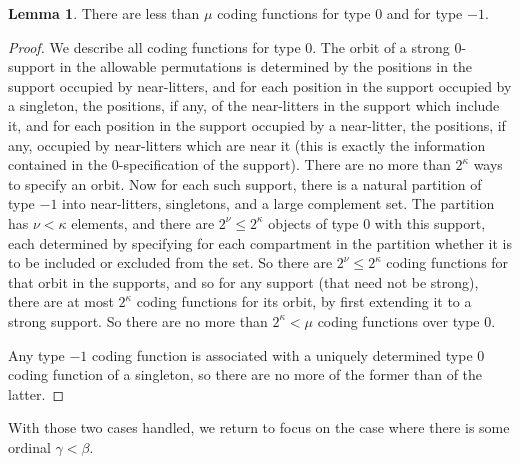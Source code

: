 \documentclass{article}
\theoremstyle{definition}
\newtheorem{lemma}[theorem]{Lemma}
\theoremstyle{remark}
\begin{document}
\begin{lemma}\label{lem:count_coding_function_zero}
There are less than $\mu$ coding functions for type 0 and for type $-1$.
\end{lemma}
\begin{proof}
We describe all coding functions for type 0.  The orbit of a strong 0-support in the allowable permutations is determined by the positions in the support  occupied by near-litters, and for each position in the support occupied by a singleton, the positions, if any, of the near-litters in the support  which include it, and for each position in the support occupied by a near-litter, the positions, if any, occupied by near-litters which are near it (this is exactly the information contained in the 0-specification of the support).
There are no more than $2^\kappa$ ways to specify an orbit.  Now for each such support, there is a natural partition of type $-1$ into near-litters, singletons, and a large complement set.
The partition has $\nu<\kappa$ elements, and there are $2^\nu\leq 2^\kappa$ objects of type 0 with this support, each determined by specifying for each compartment in the partition whether it is to be included or excluded from the set.
So there are $2^\nu\leq 2^\kappa$ coding functions for that orbit in the supports, and so for any support (that need not be strong), there are at most $2^\kappa$ coding functions for its orbit, by first extending it to a strong support.   So there are no more than $2^\kappa<\mu$ coding functions over type 0.

Any type $-1$ coding function is associated with a uniquely determined type 0 coding function of a singleton, so there are no more of the former than of the latter.

\end{proof}

With those two cases handled, we return to focus on the case where there is some ordinal $\gamma < \beta$.
\end{document}
